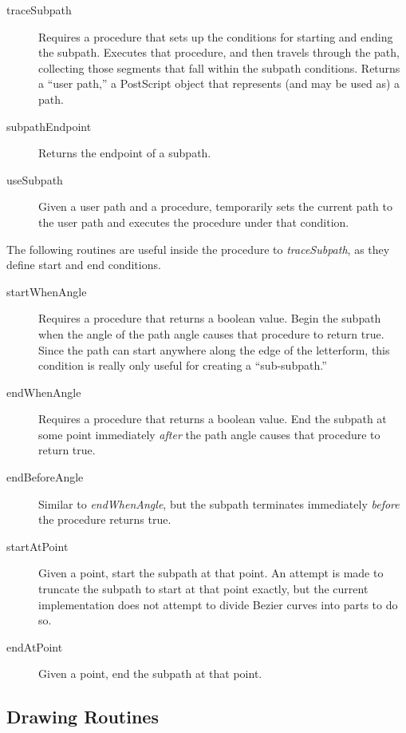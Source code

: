 \documentclass[12pt]{article}
\begin{document}
\begin{description}
\item[traceSubpath] Requires a procedure that sets up the conditions for
starting and ending the subpath. Executes that procedure, and then travels
through the path, collecting those segments that fall within the subpath
conditions. Returns a ``user path,'' a PostScript object that represents (and
may be used as) a path.

\item[subpathEndpoint] Returns the endpoint of a subpath.

\item[useSubpath] Given a user path and a procedure, temporarily sets the
current path to the user path and executes the procedure under that condition.

\end{description}

The following routines are useful inside the procedure to \emph{traceSubpath},
as they define start and end conditions.

\begin{description}
\item[startWhenAngle] Requires a procedure that returns a boolean value. Begin
the subpath when the angle of the path angle causes that procedure to return
true. Since the path can start anywhere along the edge of the letterform, this
condition is really only useful for creating a ``sub-subpath.''

\item[endWhenAngle] Requires a procedure that returns a boolean value. End the
subpath at some point immediately \emph{after} the path angle causes that
procedure to return true.

\item[endBeforeAngle] Similar to \emph{endWhenAngle}, but the subpath terminates
immediately \emph{before} the procedure returns true.

\item[startAtPoint] Given a point, start the subpath at that point. An attempt
is made to truncate the subpath to start at that point exactly, but the current
implementation does not attempt to divide Bezier curves into parts to do so.

\item[endAtPoint] Given a point, end the subpath at that point.
\end{description}

\subsection{Drawing Routines}
\end{document}
